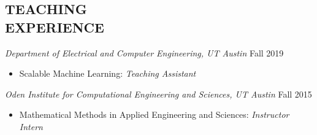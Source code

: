 \documentclass[margin, 10pt]{res} %
\begin{document}
\begin{resume}
\begin{comment}
\section{SOFTWARE}
 \textit{Github: }\url{https://github.com/cecilialeiqi/}\\
 {\sl SPIRAL} \hfill May 2016 - July 2017
 \begin{itemize}
   \item Feature representation learning of any time series data
    \end{itemize}
 {\sl DDI} \hfill Jan 2017 - May 2017
 \begin{itemize}
   \item Use an inductive tensor completion based methods to predict drug-drug interactions
   \end{itemize}
   {\sl NUTF} \hfill August 2016 - February 2017
   \begin{itemize}
     \item Negative-Unlabeled Tensor Factorization for Location\ Context 
       Inference from Inaccurate Mobility Data
      \end{itemize}
 \end{itemize} 
\end{comment} 
\section{TEACHING\\ EXPERIENCE}
{\sl Department of Electrical and Computer Engineering, UT Austin} \hfill Fall 2019
\begin{itemize}
  \item Scalable Machine Learning: {\sl Teaching Assistant}
  \end{itemize}

{\sl Oden Institute for Computational Engineering and Sciences, UT Austin} \hfill Fall 2015
\begin{itemize}
  \item Mathematical Methods in Applied Engineering and Sciences: {\sl Instructor Intern}
\end{itemize}



\end{resume}
\end{document}
